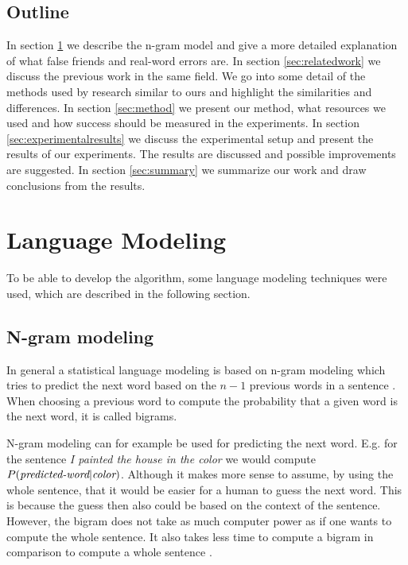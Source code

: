 \documentclass[a4paper,12pt]{article}
\begin{document}
\subsection{Outline}
\label{sec:outline}
In section \ref{sec:languagemodeling} we describe the n-gram model and give a more detailed explanation of what false friends and real-word errors are.  In section \ref{sec:relatedwork} we discuss the previous work in the same field. We go into some detail of the methods used by research similar to ours and highlight the similarities and differences. In section \ref{sec:method} we present our method, what resources we used and how success should be measured in the experiments. In section \ref{sec:experimentalresults} we discuss the experimental setup and present the results of our experiments. The results are discussed and possible improvements are suggested. In section \ref{sec:summary} we summarize our work and draw conclusions from the results. 

\section{Language Modeling}
\label{sec:languagemodeling}
To be able to develop the algorithm, some language modeling techniques were used, which are described in the following section.

\subsection{N-gram modeling}
\label{sec:ngram}
In general a statistical language modeling is based on n-gram modeling which tries to predict the next word based on the $n-1$ previous words in a sentence \cite{gallagher2004natural}.  When choosing a previous word to compute the probability that a given word is the next word, it is called bigrams. 

N-gram modeling can for example be used for predicting the next word. E.g. for the sentence \emph{I painted the house in the color} we would compute $P(\emph{predicted-word}| \emph{color})$. Although it makes more sense to assume, by using the whole sentence, that it would be easier for a human to guess the next word. This is because the guess then also could be based on the context of the sentence. However, the bigram does not take as much computer power as if one wants to compute the whole sentence. It also takes less time to compute a bigram in comparison to compute a whole sentence \cite{gallagher2004natural}.
\end{document}
